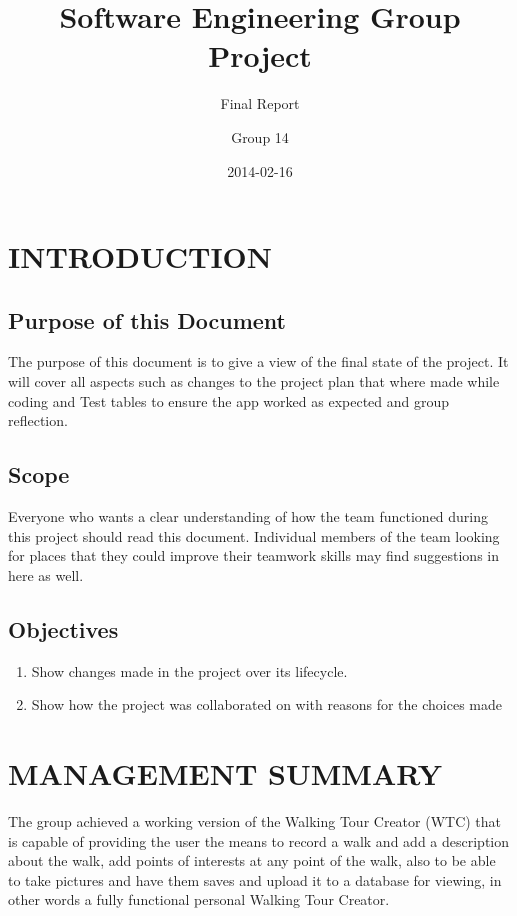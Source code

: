\documentclass{project}
\begin{document}
\title{Software Engineering Group Project}
\subtitle{Final Report}
\author{Group 14}     
\date{2014-02-16}

\maketitle

\tableofcontents

\newpage

\section{INTRODUCTION}
\subsection{Purpose of this Document}
The purpose of this document is to give a view of the final 
state of the project. It will cover all aspects such as 
changes to the project plan that where made while coding and
Test tables to ensure the app worked as expected and
group reflection.

\subsection{Scope}
Everyone who wants a clear understanding of how the team functioned during this project should read this document. Individual members of the team looking for places that they could improve their teamwork skills may find suggestions in here as well.

\subsection{Objectives}
\begin{enumerate}
	\item Show changes made in the project over its lifecycle.
    \item Show how the project was collaborated on with reasons for the choices made
\end{enumerate}

\newpage

\section{MANAGEMENT SUMMARY}

The group achieved a working version of the Walking Tour Creator (WTC) that is capable of providing the user the means to record a walk and add a description about the walk, add points of interests at any point of the walk, also to be able to take pictures and have them saves and upload it to a database for viewing, in other words a fully functional personal Walking Tour Creator.
	
\end{document}
